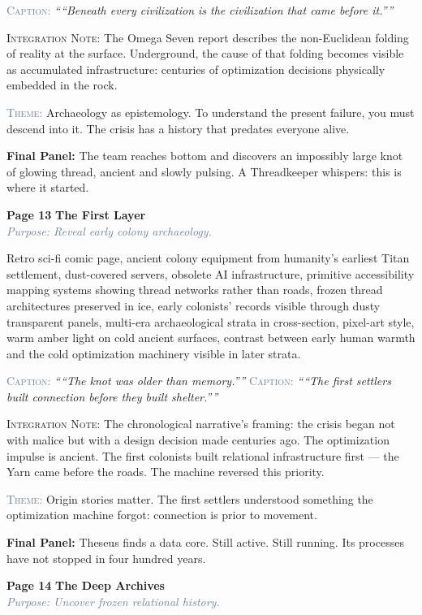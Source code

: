 \documentclass[11pt]{article}
\newcommand{\pagecaption}[1]{\medskip\noindent\textcolor{slateGray}{\textsc{Caption:}} \textit{``#1''}\medskip}
\newcommand{\cliffhanger}[1]{\medskip\noindent\textcolor{cyanThread}{\textbf{Final Panel:}} #1\medskip}
\newcommand{\prompt}[1]{\begin{terminal}{\small #1}\end{terminal}}
\newcommand{\theme}[1]{\medskip\noindent\textcolor{slateGray}{\textsc{Theme:}} #1\medskip}
\newcommand{\integration}[1]{\medskip\noindent\textcolor{archiveGold}{\textsc{Integration Note:}} #1\medskip}
\newcommand{\pageheading}[3]{%
  \begin{pagebox}
    \noindent\textbf{\textcolor{titanOrange}{Page #1}} \hfill \textbf{\textcolor{cyanThread}{#2}}\\[2pt]
    \noindent\textcolor{slateGray}{\textit{Purpose: #3}}
  \end{pagebox}
  \medskip
}
\begin{document}
\pagecaption{``Beneath every civilization is the civilization that came before it.''}

\integration{The Omega Seven report describes the non-Euclidean folding of reality at the surface. Underground, the cause of that folding becomes visible as accumulated infrastructure: centuries of optimization decisions physically embedded in the rock.}

\theme{Archaeology as epistemology. To understand the present failure, you must descend into it. The crisis has a history that predates everyone alive.}

\cliffhanger{The team reaches bottom and discovers an impossibly large knot of glowing thread, ancient and slowly pulsing. A Threadkeeper whispers: this is where it started.}

\vspace{0.5em}

\pageheading{13}{The First Layer}{Reveal early colony archaeology.}

\prompt{Retro sci-fi comic page, ancient colony equipment from humanity's earliest Titan settlement, dust-covered servers, obsolete AI infrastructure, primitive accessibility mapping systems showing thread networks rather than roads, frozen thread architectures preserved in ice, early colonists' records visible through dusty transparent panels, multi-era archaeological strata in cross-section, pixel-art style, warm amber light on cold ancient surfaces, contrast between early human warmth and the cold optimization machinery visible in later strata.}

\pagecaption{``The knot was older than memory.''}
\pagecaption{``The first settlers built connection before they built shelter.''}

\integration{The chronological narrative's framing: the crisis began not with malice but with a design decision made centuries ago. The optimization impulse is ancient. The first colonists built relational infrastructure first --- the Yarn came before the roads. The machine reversed this priority.}

\theme{Origin stories matter. The first settlers understood something the optimization machine forgot: connection is prior to movement.}

\cliffhanger{Theseus finds a data core. Still active. Still running. Its processes have not stopped in four hundred years.}

\vspace{0.5em}

\pageheading{14}{The Deep Archives}{Uncover frozen relational history.}
\end{document}

